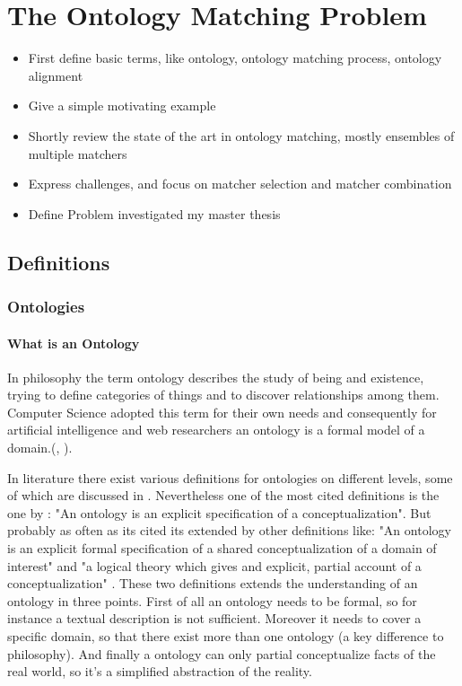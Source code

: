\documentclass[11pt,titlepage,oneside,openany,a4paper]{report}
\begin{document}
\chapter{The Ontology Matching Problem}
\label{chap:om_problem}
	\begin{itemize}
	\item First define basic terms, like ontology, ontology matching process, ontology alignment
	\item Give a simple motivating example
	\item Shortly review the state of the art in ontology matching, mostly ensembles of multiple matchers
	\item Express challenges, and focus on matcher selection and matcher combination
	\item Define Problem investigated my master thesis
	\end{itemize}
	\section{Definitions}
	\label{sec:defintions}

	\subsection{Ontologies}
	\label{sec:ontologies_def}
	\subsubsection{What is an Ontology}
In philosophy the term ontology describes the study of being and existence, trying to define categories of things and to discover relationships among them. Computer Science adopted this term for their own needs and consequently for artificial intelligence  and web researchers an ontology is a formal model of a domain.(\cite{ehrig2006ontology}, \cite{paulheim2011ontology}). 

In literature there exist various definitions for ontologies on different levels, some of which are discussed in \cite{Guarino:1997}. Nevertheless one of the most cited definitions is the one by \cite{Gruber:1995}: "An ontology is an explicit specification of a conceptualization".  But probably as often as its cited its extended by other definitions like: "An ontology is an explicit formal specification of a shared conceptualization of a domain of interest"\cite{Studer:1998} and "a logical theory which gives and explicit, partial account of a conceptualization" \cite{Guarino95}. These two definitions extends the understanding of an ontology in three points. First of all an ontology needs to be formal, so for instance a textual description is not sufficient.\cite{Studer:1998} Moreover it needs to cover a specific domain, so that there exist more than one ontology (a key difference to philosophy). And finally a ontology can only partial conceptualize facts of the real world, so it's a simplified abstraction of the reality.\cite{ehrig2006ontology}
\end{document}
